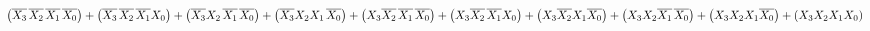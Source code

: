 \documentclass[preview]{standalone}
\begin{document}
\begin{align*}
\left(\overline{X_3}\hspace{0.05cm}\overline{X_2}\hspace{0.05cm}\overline{X_1}\hspace{0.05cm}\overline{X_0}\right)+\left(\overline{X_3}\hspace{0.05cm}\overline{X_2}\hspace{0.05cm}\overline{X_1}X_0\right)+\left(\overline{X_3}X_2\hspace{0.05cm}\overline{X_1}\hspace{0.05cm}\overline{X_0}\right)+\left(\overline{X_3}X_2X_1\hspace{0.05cm}\overline{X_0}\right)+\left(X_3\overline{X_2}\hspace{0.05cm}\overline{X_1}\hspace{0.05cm}\overline{X_0}\right)+\left(X_3\overline{X_2}\hspace{0.05cm}\overline{X_1}X_0\right)+\left(X_3\overline{X_2}X_1\overline{X_0}\right)+\left(X_3X_2\overline{X_1}\hspace{0.05cm}\overline{X_0}\right)+\left(X_3X_2X_1\overline{X_0}\right)+\left(X_3X_2X_1X_0\right)
\end{align*}
\end{document}
